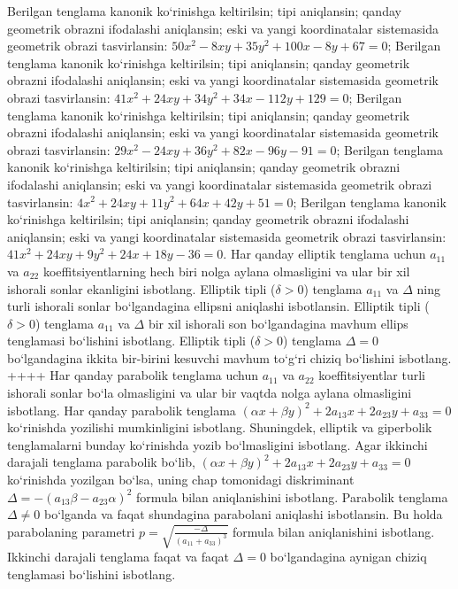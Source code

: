 Berilgan tenglama kanonik ko‘rinishga keltirilsin; tipi aniqlansin; qanday geometrik obrazni ifodalashi aniqlansin; eski va yangi koordinatalar sistemasida geometrik obrazi tasvirlansin: $50 x^2-8 x y+35 y^2+100 x-8 y+67=0$;
Berilgan tenglama kanonik ko‘rinishga keltirilsin; tipi aniqlansin; qanday geometrik obrazni ifodalashi aniqlansin; eski va yangi koordinatalar sistemasida geometrik obrazi tasvirlansin: $41 x^2+24 x y+34 y^2+34 x-112 y+129=0$;
Berilgan tenglama kanonik ko‘rinishga keltirilsin; tipi aniqlansin; qanday geometrik obrazni ifodalashi aniqlansin; eski va yangi koordinatalar sistemasida geometrik obrazi tasvirlansin: $29 x^2-24 x y+36 y^2+82 x-96 y-91=0$;
Berilgan tenglama kanonik ko‘rinishga keltirilsin; tipi aniqlansin; qanday geometrik obrazni ifodalashi aniqlansin; eski va yangi koordinatalar sistemasida geometrik obrazi tasvirlansin: $4 x^2+24 x y+11 y^2+64 x+42 y+51=0$;
Berilgan tenglama kanonik ko‘rinishga keltirilsin; tipi aniqlansin; qanday geometrik obrazni ifodalashi aniqlansin; eski va yangi koordinatalar sistemasida geometrik obrazi tasvirlansin: $41 x^2+24 x y+9 y^2+24 x+18 y-36=0$.
Har qanday elliptik tenglama uchun $a_{11}$ va $a_{22}$ koeffitsiyentlarning hech biri nolga aylana olmasligini va ular bir xil ishorali sonlar ekanligini isbotlang.
Elliptik tipli ($\delta>0$) tenglama $a_{11}$ va $\Delta$ ning turli ishorali sonlar bo‘lgandagina ellipsni aniqlashi isbotlansin.
Elliptik tipli ($\delta>0$) tenglama $a_{11}$ va $\Delta$ bir xil ishorali son bo‘lgandagina mavhum ellips tenglamasi bo‘lishini isbotlang.
Elliptik tipli ($\delta>0$) tenglama $\Delta=0$ bo‘lgandagina ikkita bir-birini kesuvchi mavhum to‘g‘ri chiziq bo‘lishini isbotlang.
++++
Har qanday parabolik tenglama uchun $a_{11}$ va $a_{22}$ koeffitsiyentlar turli ishorali sonlar bo‘la olmasligini va ular bir vaqtda nolga aylana olmasligini isbotlang.
Har qanday parabolik tenglama $ (\alpha x+\beta y) ^2+2a_{13}x+2a_{23}y+a_{33}=0$ ko‘rinishda yozilishi mumkinligini isbotlang. Shuningdek, elliptik va giperbolik tenglamalarni bunday ko‘rinishda yozib bo‘lmasligini isbotlang.
Agar ikkinchi darajali tenglama parabolik bo‘lib, $ (\alpha x+\beta y) ^2+2a_{13}x+2a_{23}y+a_{33}=0$ ko‘rinishda yozilgan bo‘lsa, uning chap tomonidagi diskriminant $\Delta=- (a_{13} \beta-a_{23} \alpha) ^2$ formula bilan aniqlanishini isbotlang.
Parabolik tenglama $\Delta \neq 0$ bo‘lganda va faqat shundagina parabolani aniqlashi isbotlansin. Bu holda parabolaning parametri $p=\sqrt{\frac{-\Delta}{ (a_{11}+a_{33}) ^3}}$ formula bilan aniqlanishini isbotlang.
Ikkinchi darajali tenglama faqat va faqat $\Delta=0$ bo‘lgandagina aynigan chiziq tenglamasi bo‘lishini isbotlang.

